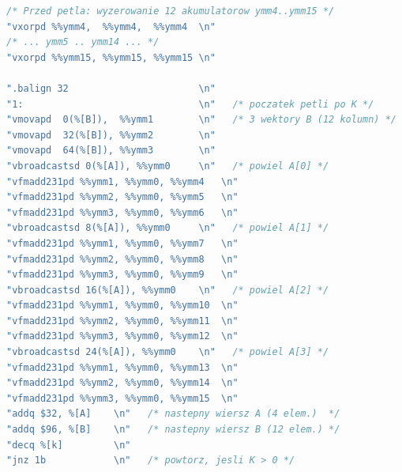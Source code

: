 \documentclass[a4paper,12pt]{book} %
\begin{document}
\begin{lstfloat}[t!]
\begin{lstlisting}[language=C, caption={Mnożenie dwóch macierzy --- pętla K mikrojądra 4$\times$12 w asemblerze (składnia AT\&T). Akumulatory \texttt{ymm4}--\texttt{ymm15} zerowane przed pętlą; w pętli trzy odczyty B, cztery powielenia A, dwanaście instrukcji FMA. Epilog (pominięty) stosuje \texttt{vfmadd213pd}: $C = \alpha\cdot\mathrm{acc} + C$}, label={lst:gemm-asm}]
/* Przed petla: wyzerowanie 12 akumulatorow ymm4..ymm15 */
"vxorpd %%ymm4,  %%ymm4,  %%ymm4  \n"
/* ... ymm5 .. ymm14 ... */
"vxorpd %%ymm15, %%ymm15, %%ymm15 \n"

".balign 32                       \n"
"1:                               \n"   /* poczatek petli po K */
"vmovapd  0(%[B]),  %%ymm1        \n"   /* 3 wektory B (12 kolumn) */
"vmovapd  32(%[B]), %%ymm2        \n"
"vmovapd  64(%[B]), %%ymm3        \n"
"vbroadcastsd 0(%[A]), %%ymm0     \n"   /* powiel A[0] */
"vfmadd231pd %%ymm1, %%ymm0, %%ymm4   \n"
"vfmadd231pd %%ymm2, %%ymm0, %%ymm5   \n"
"vfmadd231pd %%ymm3, %%ymm0, %%ymm6   \n"
"vbroadcastsd 8(%[A]), %%ymm0     \n"   /* powiel A[1] */
"vfmadd231pd %%ymm1, %%ymm0, %%ymm7   \n"
"vfmadd231pd %%ymm2, %%ymm0, %%ymm8   \n"
"vfmadd231pd %%ymm3, %%ymm0, %%ymm9   \n"
"vbroadcastsd 16(%[A]), %%ymm0    \n"   /* powiel A[2] */
"vfmadd231pd %%ymm1, %%ymm0, %%ymm10  \n"
"vfmadd231pd %%ymm2, %%ymm0, %%ymm11  \n"
"vfmadd231pd %%ymm3, %%ymm0, %%ymm12  \n"
"vbroadcastsd 24(%[A]), %%ymm0    \n"   /* powiel A[3] */
"vfmadd231pd %%ymm1, %%ymm0, %%ymm13  \n"
"vfmadd231pd %%ymm2, %%ymm0, %%ymm14  \n"
"vfmadd231pd %%ymm3, %%ymm0, %%ymm15  \n"
"addq $32, %[A]    \n"   /* nastepny wiersz A (4 elem.)  */
"addq $96, %[B]    \n"   /* nastepny wiersz B (12 elem.) */
"decq %[k]         \n"
"jnz 1b            \n"   /* powtorz, jesli K > 0 */
\end{lstlisting}
\end{lstfloat}
\end{document}
